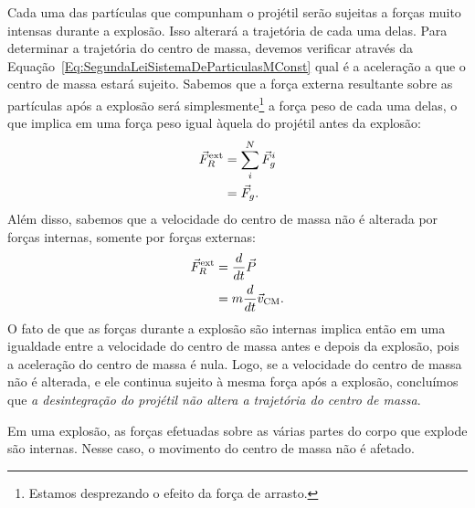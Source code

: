 Cada uma das partículas que compunham o projétil serão sujeitas a forças muito intensas durante a explosão. Isso alterará a trajetória de cada uma delas. Para determinar a trajetória do centro de massa, devemos verificar através da Equação~\eqref{Eq:SegundaLeiSistemaDeParticulasMConst} qual é a aceleração a que o centro de massa estará sujeito. Sabemos que a força externa resultante sobre as partículas após a explosão será simplesmente\footnote{Estamos desprezando o efeito da força de arrasto.} a força peso de cada uma delas, o que implica em uma força peso igual àquela do projétil antes da explosão:
\begin{align}
	\vec{F}_{R}^{\rm{ext}} &= \sum_i^N \vec{F}_g^i \\
		&= \vec{F}_g.
\end{align}
%
Além disso, sabemos que a velocidade do centro de massa não é alterada por forças internas, somente por forças externas:
\begin{align}
	\vec{F}_R^{\rm{ext}} &= \frac{d}{dt}\vec{P} \\
		&= m\frac{d}{dt}\vec{v}_{\rm{CM}}.
\end{align}
%
O fato de que as forças durante a explosão são internas implica então em uma igualdade entre a velocidade do centro de massa antes e depois da explosão, pois a aceleração do centro de massa é nula. Logo, se a velocidade do centro de massa não é alterada, e ele continua sujeito à mesma força após a explosão, concluímos que \emph{a desintegração do projétil não altera a trajetória do centro de massa}.

\begin{marginfigure}
\centering
{}
\caption{Em uma explosão, as forças efetuadas sobre as várias partes do corpo que explode são internas. Nesse caso, o movimento do centro de massa não é afetado.\label{Fig:ExplosaoProjetil}}
\end{marginfigure}


